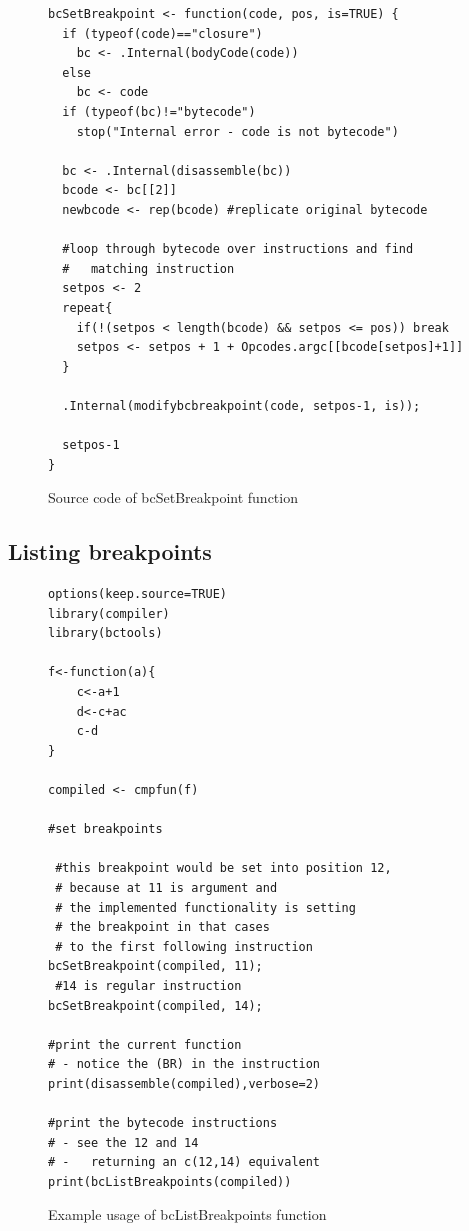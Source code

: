 \documentclass[thesis=M,english]{FITthesis}[2018/10/20]
\begin{document}
\begin{figure}[H]
\begin{lstlisting}
bcSetBreakpoint <- function(code, pos, is=TRUE) {
  if (typeof(code)=="closure")
    bc <- .Internal(bodyCode(code))
  else
    bc <- code
  if (typeof(bc)!="bytecode")
    stop("Internal error - code is not bytecode")

  bc <- .Internal(disassemble(bc))
  bcode <- bc[[2]]
  newbcode <- rep(bcode) #replicate original bytecode

  #loop through bytecode over instructions and find
  #   matching instruction
  setpos <- 2
  repeat{
    if(!(setpos < length(bcode) && setpos <= pos)) break
    setpos <- setpos + 1 + Opcodes.argc[[bcode[setpos]+1]]
  }

  .Internal(modifybcbreakpoint(code, setpos-1, is));

  setpos-1
}
\end{lstlisting}
	\caption{Source code of bcSetBreakpoint function}\label{fig:bcsetbreakpoint-source}
\end{figure}

\subsection{Listing breakpoints}\label{listing-breakpoints}

\begin{figure}[h]
\begin{lstlisting}
options(keep.source=TRUE)
library(compiler)
library(bctools)

f<-function(a){
    c<-a+1
    d<-c+ac
    c-d
}

compiled <- cmpfun(f)

#set breakpoints

 #this breakpoint would be set into position 12,
 # because at 11 is argument and
 # the implemented functionality is setting
 # the breakpoint in that cases
 # to the first following instruction
bcSetBreakpoint(compiled, 11);
 #14 is regular instruction
bcSetBreakpoint(compiled, 14);

#print the current function
# - notice the (BR) in the instruction
print(disassemble(compiled),verbose=2)

#print the bytecode instructions
# - see the 12 and 14
# -   returning an c(12,14) equivalent
print(bcListBreakpoints(compiled))
\end{lstlisting}
	\caption{Example usage of bcListBreakpoints function}\label{fig:bclistbreakpoints-example}
\end{figure}
\end{document}
